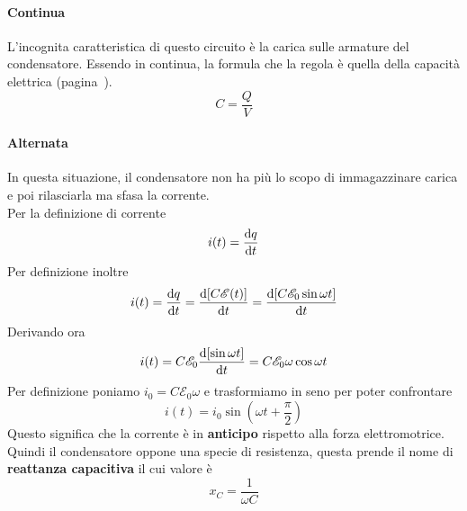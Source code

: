 \paragraph{Continua}
\begin{center}
\end{center}
L'incognita caratteristica di questo circuito è la carica sulle armature del condensatore. Essendo
in continua, la formula che la regola è quella della capacità elettrica
(pagina~\pageref{sub:elettrostatica:capacita}).
\begin{equation*}
  C = \frac{Q}{V}
\end{equation*}

\paragraph{Alternata}
\begin{center}
\end{center}
In questa situazione, il condensatore non ha più lo scopo di immagazzinare carica e poi rilasciarla
ma sfasa la corrente.\\
Per la definizione di corrente
\begin{equation*}
  i(t) = \frac{\mathop{}\!\mathrm{d} q}{\mathop{}\!\mathrm{d} t}
\end{equation*}
Per definizione inoltre
\begin{equation*}
  i(t) = \frac{\mathop{}\!\mathrm{d} q}{\mathop{}\!\mathrm{d} t} = \frac{\mathop{}\!\mathrm{d} [C\mathcal{E}(t)]}{\mathop{}\!\mathrm{d} t} = \frac{\mathop{}\!\mathrm{d} [C\mathcal{E}_0\sin\omega t]}{\mathop{}\!\mathrm{d} t}
\end{equation*}
Derivando ora
\begin{equation*}
  i(t) = C\mathcal{E}_0\frac{\mathop{}\!\mathrm{d} [\sin\omega t]}{\mathop{}\!\mathrm{d} t} = C\mathcal{E}_0\omega\cos\omega t
\end{equation*}
Per definizione poniamo $i_0=C\mathcal{E}_0\omega$ e trasformiamo in seno per poter confrontare
\begin{equation*}
  i(t) = i_0\sin \left( \omega t+\frac{\pi}{2} \right)
\end{equation*}
Questo significa che la corrente è in \textbf{anticipo} rispetto alla forza elettromotrice.\\
Quindi il condensatore oppone una specie di resistenza, questa prende il nome di 
\textbf{reattanza capacitiva} il cui valore è
\begin{equation*}
  x_C = \frac{1}{\omega C}
\end{equation*}

